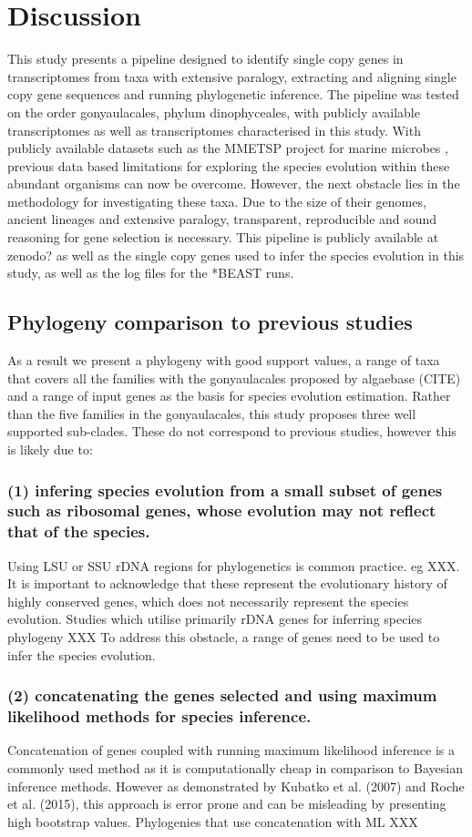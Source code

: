 \documentclass[12pt]{article}
\begin{document}
\section{Discussion}
This study presents a pipeline designed to identify single copy genes in transcriptomes from taxa with extensive paralogy, extracting and aligning single copy gene sequences and running phylogenetic inference. 
The pipeline was tested on the order gonyaulacales, phylum dinophyceales, with publicly available transcriptomes as well as transcriptomes characterised in this study. 
With publicly available datasets such as the MMETSP project for marine microbes \cite{keeling2014marine}, previous data based limitations for exploring the species evolution within these abundant organisms can now be overcome. 
However, the next obstacle lies in the methodology for investigating these taxa. 
Due to the size of their genomes, ancient lineages and extensive paralogy, transparent, reproducible and sound reasoning for gene selection is necessary. 
This pipeline is publicly available at zenodo? as well as the single copy genes used to infer the species evolution in this study, as well as the log files for the *BEAST runs.
\subsection*{Phylogeny comparison to previous studies} 
As a result we present a phylogeny with good support values, a range of taxa that covers all the families with the gonyaulacales proposed by algaebase (CITE) and a range of input genes as the basis for species evolution estimation.
Rather than the five families in the gonyaulacales, this study proposes three well supported sub-clades. 
These do not correspond to previous studies, however this is likely due to: 
\subsubsection*{(1) infering species evolution from a small subset of genes such as ribosomal genes, whose evolution may not reflect that of the species.}
Using LSU or SSU rDNA regions for phylogenetics is common practice. eg XXX. 
It is important to acknowledge that these represent the evolutionary history of highly conserved genes, which does not necessarily represent the species evolution. 
Studies which utilise primarily rDNA genes for inferring species phylogeny XXX
To address this obstacle, a range of genes need to be used to infer the species evolution.
\subsubsection*{(2) concatenating the genes selected and using maximum likelihood methods for species inference.}
Concatenation of genes coupled with running maximum likelihood inference is a commonly used method as it is computationally cheap in comparison to Bayesian inference methods. 
However as demonstrated by Kubatko et al. (2007) and Roche et al. (2015), this approach is error prone and can be misleading by presenting high bootstrap values.
Phylogenies that use concatenation with ML XXX
\end{document}
